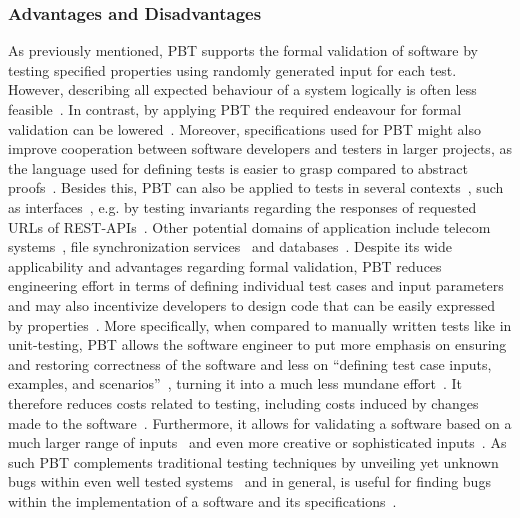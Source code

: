 \documentclass[runningheads]{llncs}
\begin{document}
\subsubsection{Advantages and Disadvantages}
As previously mentioned, PBT supports the formal validation of software by testing specified properties using randomly generated input for each test. However, describing all expected behaviour of a system logically is often less feasible~\cite{Chen2022,Koopman2012}. In contrast, by applying PBT the required endeavour for formal validation can be lowered~\cite{Hritcu2016,Chen2022,Paraskevopoulou2015}. Moreover, specifications used for PBT might also improve cooperation between software developers and testers in larger projects, as the language used for defining tests is easier to grasp compared to abstract proofs~\cite{Chen2022,Loescher2017}. Besides this, PBT can also be applied to tests in several contexts~\cite{Karlsson2019}, such as interfaces~\cite{Karlsson2019,Francisco2013,LamelaSeijas2013}, e.g. by testing invariants regarding the responses of requested URLs of REST-APIs~\cite{Karlsson2019}. Other potential domains of application include telecom systems~\cite{Arts2006}, file synchronization services~\cite{Hughes2016} and databases~\cite{Arts2015}. Despite its wide applicability and advantages regarding formal validation, PBT reduces engineering effort in terms of defining individual test cases and input parameters~\cite{Chen2022,Loescher2017,Corgozinho2023} and may also incentivize developers to design code that can be easily expressed by properties~\cite{Chen2022}. More specifically, when compared to manually written tests like in unit-testing, PBT allows the software engineer to put more emphasis on ensuring and restoring correctness of the software and less on ``defining test case inputs, examples, and scenarios''~\cite{Corgozinho2023}, turning it into a much less mundane effort~\cite{Loescher2017}. It therefore reduces costs related to testing, including costs induced by changes made to the software~\cite{Chen2022,Loescher2017}. Furthermore, it allows for validating a software based on a much larger range of inputs~\cite{Loescher2017,Corgozinho2023} and even more creative or sophisticated inputs~\cite{Arts2015}. As such PBT complements traditional testing techniques by unveiling yet unknown bugs within even well tested systems~\cite{Arts2015,Hughes2016,Arts2006} and in general, is useful for finding bugs within the implementation of a software and its specifications~\cite{Chen2022,Fink1997,Loescher2017,Paraskevopoulou2015,Claessen2000,Corgozinho2023}.
\end{document}
